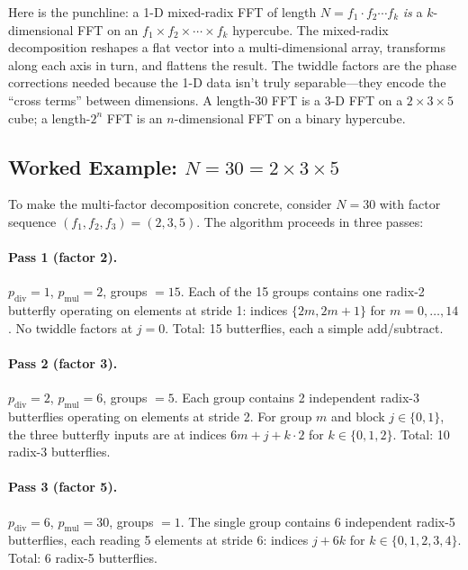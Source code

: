 \documentclass[12pt,a4paper]{report}
\theoremstyle{thms}
\theoremstyle{defns}
\begin{document}
Here is the punchline: a 1-D mixed-radix FFT of length $N = f_1 \cdot f_2 \cdots f_k$ \textit{is} a $k$-dimensional FFT on an $f_1 \times f_2 \times \cdots \times f_k$ hypercube. The mixed-radix decomposition reshapes a flat vector into a multi-dimensional array, transforms along each axis in turn, and flattens the result. The twiddle factors are the phase corrections needed because the 1-D data isn't truly separable—they encode the ``cross terms'' between dimensions. A length-30 FFT is a 3-D FFT on a $2 \times 3 \times 5$ cube; a length-$2^n$ FFT is an $n$-dimensional FFT on a binary hypercube.

\subsection{Worked Example: $N = 30 = 2 \times 3 \times 5$}

To make the multi-factor decomposition concrete, consider $N = 30$ with factor sequence $(f_1, f_2, f_3) = (2, 3, 5)$. The algorithm proceeds in three passes:

\paragraph{Pass 1 (factor 2).} $p_{\mathrm{div}} = 1$, $p_{\mathrm{mul}} = 2$, groups $= 15$. Each of the 15 groups contains one radix-2 butterfly operating on elements at stride 1: indices $\{2m, 2m+1\}$ for $m = 0, \ldots, 14$. No twiddle factors at $j = 0$. Total: 15 butterflies, each a simple add/subtract.

\paragraph{Pass 2 (factor 3).} $p_{\mathrm{div}} = 2$, $p_{\mathrm{mul}} = 6$, groups $= 5$. Each group contains 2 independent radix-3 butterflies operating on elements at stride 2. For group $m$ and block $j \in \{0, 1\}$, the three butterfly inputs are at indices $6m + j + k \cdot 2$ for $k \in \{0, 1, 2\}$. Total: 10 radix-3 butterflies.

\paragraph{Pass 3 (factor 5).} $p_{\mathrm{div}} = 6$, $p_{\mathrm{mul}} = 30$, groups $= 1$. The single group contains 6 independent radix-5 butterflies, each reading 5 elements at stride 6: indices $j + 6k$ for $k \in \{0, 1, 2, 3, 4\}$. Total: 6 radix-5 butterflies.
\end{document}
